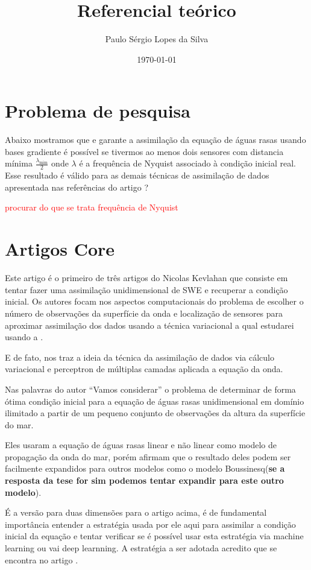 \documentclass[12pt,a4paper]{article}
\author{Paulo Sérgio Lopes da Silva}
\title{Referencial teórico}
\date{\today}
\begin{document}
	
	\maketitle
	\section{Problema de pesquisa}
	
	Abaixo mostramos que \cite{kevlahan2019convergence} e \cite{khan2022data} garante a assimilação da equação de águas rasas usando bases gradiente é possível se tivermos ao menos dois sensores com distancia mínima $\frac{\lambda_{\textrm{mim}}}{2}$ onde $\lambda$ é a frequência de Nyquist  associado à condição inicial real. Esse resultado é válido para as demais técnicas de assimilação de dados apresentada nas referências do artigo \cite{ghorbani2023data} ?
	
	\textcolor{red}{procurar do que se trata frequência de Nyquist}
	
	\section{Artigos Core}
	\cite{kevlahan2019convergence} Este artigo é o primeiro de três artigos do Nicolas Kevlahan que consiste em tentar fazer uma assimilação unidimensional de SWE e recuperar a condição inicial. Os autores focam nos aspectos computacionais do problema de  escolher o número de observações da superfície da onda  e localização de sensores para aproximar assimilação dos dados usando a técnica variacional a qual estudarei usando a \cite{furtado2012data}.
	
	E de fato, \cite{furtado2012data} nos traz a ideia da técnica da assimilação de dados via cálculo variacional e perceptron de múltiplas camadas aplicada a equação da onda.
	
	Nas palavras do autor ``Vamos considerar'' o problema de determinar de forma ótima  condição inicial para a equação de águas rasas unidimensional em domínio ilimitado a partir de um pequeno conjunto de observações da altura da superfície do mar.
	
	Eles usaram a equação de águas rasas linear e não linear como modelo de propagação da onda do mar, porém afirmam que o resultado deles podem ser facilmente expandidos para outros modelos como o modelo Boussinesq(\textbf{se a resposta da tese for sim podemos tentar expandir para este outro modelo}).
	
	
	\cite{khan2022data} É a versão para duas dimensões para o artigo acima, é de fundamental importância entender a estratégia usada por ele aqui para assimilar a condição inicial da equação e tentar verificar se é possível usar esta estratégia via machine learning ou vai deep learnning. A estratégia a ser adotada acredito que se encontra no artigo \cite{ghorbani2023data}.
	
\end{document}
